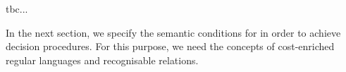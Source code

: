 {tbc...


In the next section, we specify the semantic conditions for {\slint} in order to achieve decision procedures. For this purpose, we need the concepts of cost-enriched regular languages and recognisable relations. 

}